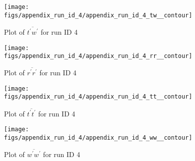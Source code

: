 \begin{figure}[H]
\centering
\texttt{[image: figs/appendix\_run\_id\_4/appendix\_run\_id\_4\_tw\_\_contour]}
\caption{Plot of $\overline{t^\prime w^\prime}$ for run ID 4}
\label{fig:appendix_run_id_4_tw__contour}
\end{figure}


\begin{figure}[H]
\centering
\texttt{[image: figs/appendix\_run\_id\_4/appendix\_run\_id\_4\_rr\_\_contour]}
\caption{Plot of $\overline{r^\prime r^\prime}$ for run ID 4}
\label{fig:appendix_run_id_4_rr__contour}
\end{figure}


\begin{figure}[H]
\centering
\texttt{[image: figs/appendix\_run\_id\_4/appendix\_run\_id\_4\_tt\_\_contour]}
\caption{Plot of $\overline{t^\prime t^\prime}$ for run ID 4}
\label{fig:appendix_run_id_4_tt__contour}
\end{figure}


\begin{figure}[H]
\centering
\texttt{[image: figs/appendix\_run\_id\_4/appendix\_run\_id\_4\_ww\_\_contour]}
\caption{Plot of $\overline{w^\prime w^\prime}$ for run ID 4}
\label{fig:appendix_run_id_4_ww__contour}
\end{figure}


